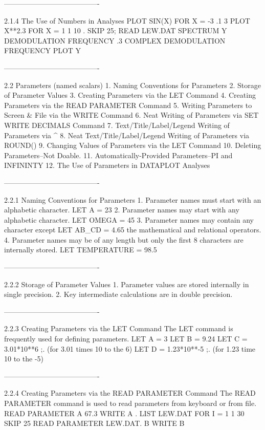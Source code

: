 ----------------------------------------
 
2.1.4
The Use of Numbers in Analyses
   PLOT SIN(X) FOR X = -3 .1 3
   PLOT X**2.3 FOR X = 1 1 10
   .
   SKIP 25; READ LEW.DAT
   SPECTRUM Y
   DEMODULATION FREQUENCY .3
   COMPLEX DEMODULATION FREQUENCY PLOT Y
 
----------------------------------------
 
2.2
Parameters (named scalars)
   1. Naming Conventions for Parameters
   2. Storage of Parameter Values
   3. Creating Parameters via the LET Command
   4. Creating Parameters via the READ PARAMETER Command
   5. Writing Parameters to Screen & File via the WRITE Command
   6. Neat Writing of Parameters via SET WRITE DECIMALS Command
   7. Text/Title/Label/Legend Writing of Parameters via ^
   8. Neat Text/Title/Label/Legend Writing of Parameters via ROUND()
   9. Changing Values of Parameters via the LET Command
  10. Deleting Parameters--Not Doable.
  11. Automatically-Provided Parameters--PI and INFININTY
  12. The Use of Parameters in DATAPLOT Analyses
 
----------------------------------------
 
2.2.1
Naming Conventions for Parameters
   1. Parameter names must start with an alphabetic character.
         LET A = 23
   2. Parameter names may start with any alphabetic character.
         LET OMEGA = 45
   3. Parameter names may contain any character except
         LET AB_CD = 4.65
      the mathematical and relational operators.
   4. Parameter names may be of any length but only the
      first 8 characters are internally stored.
         LET TEMPERATURE = 98.5
 
----------------------------------------
 
2.2.2
Storage of Parameter Values
   1. Parameter values are stored internally in single precision.
   2. Key intermediate calculations are in double precision.
 
----------------------------------------
 
2.2.3
Creating Parameters via the LET Command
   The LET command is frequently used for defining parameters.
      LET A = 3
      LET B = 9.24
      LET C = 3.01*10**6 ;. (for 3.01 times 10 to the 6)
      LET D = 1.23*10**-5 ;. (for 1.23 time 10 to the -5)
 
----------------------------------------
 
2.2.4
Creating Parameters via the READ PARAMETER Command
   The READ PARAMETER command is used to read parameters
   from keyboard or from file.
      READ PARAMETER A
      67.3
      WRITE A
      .
      LIST LEW.DAT FOR I = 1 1 30
      SKIP 25
      READ PARAMETER LEW.DAT. B
      WRITE B
 
